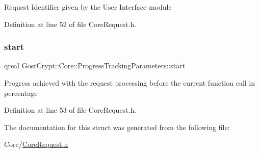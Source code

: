 Request Identifier given by the User Interface module 

Definition at line 52 of file Core\+Request.\+h.

\mbox{\label{struct_gost_crypt_1_1_core_1_1_progress_tracking_parameters_a4b1108100f824c96553d57697c2739b4}} 
\subsubsection{\texorpdfstring{start}{start}}
{\footnotesize\ttfamily qreal Gost\+Crypt\+::\+Core\+::\+Progress\+Tracking\+Parameters\+::start}

Progress achieved with the request processing before the current function call in percentage 

Definition at line 53 of file Core\+Request.\+h.



The documentation for this struct was generated from the following file\+:\begin{DoxyCompactItemize}
\item 
Core/\hyperlink{_core_request_8h}{Core\+Request.\+h}\end{DoxyCompactItemize}
